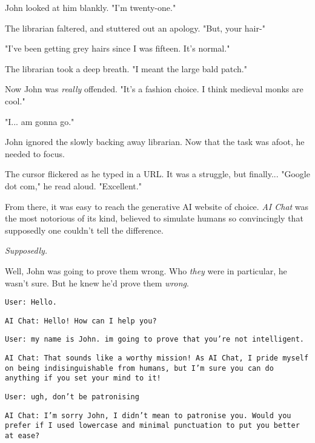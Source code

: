  

John looked at him blankly. "I'm twenty-one." 

 

The librarian faltered, and stuttered out an apology. "But, your hair-" 

 

"I've been getting grey hairs since I was fifteen. It's normal." 

 

The librarian took a deep breath. "I meant the large bald patch." 

 

Now John was \textit{really} offended. "It's a fashion choice. I think medieval monks are cool." 

 

"I... am gonna go." 

 

John ignored the slowly backing away librarian. Now that the task was afoot, he needed to focus. 

The cursor flickered as he typed in a URL. It was a struggle, but finally... "Google dot com," he read aloud. "Excellent." 

From there, it was easy to reach the generative AI website of choice. \textit{AI Chat} was the most notorious of its kind, believed to simulate humans so convincingly that supposedly one couldn't tell the difference. 

\textit{Supposedly.} 

Well, John was going to prove them wrong. Who \textit{they} were in particular, he wasn't sure. But he knew he'd prove them \textit{wrong}. 


\texttt{User: Hello.}

\texttt{AI Chat: Hello! How can I help you?}

\texttt{User: my name is John. im going to prove that you're not intelligent.} 

\texttt{AI Chat: That sounds like a worthy mission! As AI Chat, I pride myself on being indisinguishable from humans, but I'm sure you can do anything if you set your mind to it!}

\texttt{User: ugh, don't be patronising} 

\texttt{AI Chat: I'm sorry John, I didn't mean to patronise you. Would you prefer if I used lowercase and minimal punctuation to put you better at ease?}

